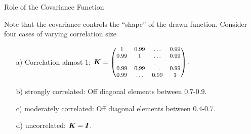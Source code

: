 \documentclass[11pt,compress,t,notes=noshow, xcolor=table]{beamer}
\begin{document}






\begin{vbframe}{Role of the Covariance Function}

Note that the covariance controls the \enquote{shape} of the drawn function. Consider four cases of varying correlation size
\vspace{10pt}

\begin{enumerate}
  \item[a)] Correlation almost 1: $\bm{K} = \begin{footnotesize}\begin{pmatrix} 1 & 0.99 & \dots & 0.99 \\
  0.99 & 1 & \dots & 0.99 \\
  0.99 & 0.99 & \ddots & 0.99 \\
  0.99 & \dots & 0.99 & 1 \end{pmatrix}.\end{footnotesize}$
  \vspace{10pt}
  \item[b)] strongly correlated: Off diagonal elements between 0.7-0.9.
  \vspace{10pt}
  \item[c)] moderately correlated: Off diagonal elements between 0.4-0.7.
  \vspace{10pt}
  \item[d)] uncorrelated: $\bm{K} = \boldsymbol{I}$.
\end{enumerate}

\end{vbframe}
\end{document}
